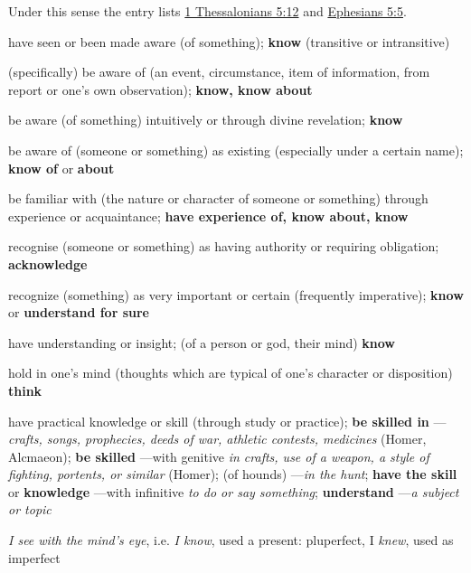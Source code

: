 \begin{compactdesc}
\begin{compactitem}
\begin{compactitem}
									\item Under this sense the entry lists \hyperref[1THESSALONIANS-5-12]{1 Thessalonians 5:12} and \hyperref[EPHESIANS-5-5]{Ephesians 5:5}.
								\end{compactitem}
						\end{compactitem}
					\item[CGL 988b, PDF 1028] \textbf{}
						\begin{compactitem}
							\item[1] have seen or been made aware (of something); \textbf{know} (transitive or intransitive)
							\item[2] (specifically) be aware of (an event, circumstance, item of information, from report or one's own observation); \textbf{know, know about}
							\item[3] be aware (of something) intuitively or through divine revelation; \textbf{know}
							\item[4] be aware of (someone or something) as existing (especially under a certain name); \textbf{know of} or \textbf{about}
							\item[5] be familiar with (the nature or character of someone or something) through experience or acquaintance; \textbf{have experience of, know about, know}
							\item[6] recognise (someone or something) as having authority or requiring obligation; \textbf{acknowledge}
							\item[7] recognize (something) as very important or certain (frequently imperative); \textbf{know} or \textbf{understand for sure}
							\item[8] have understanding or insight; (of a person or god, their mind) \textbf{know}
							\item[9] hold in one's mind (thoughts which are typical of one's character or disposition) \textbf{think}
							\item[10] have practical knowledge or skill (through study or practice); \textbf{be skilled in} ---\textit{crafts, songs, prophecies, deeds of war, athletic contests, medicines} (Homer, Alcmaeon); \textbf{be skilled} ---with genitive \textit{in crafts, use of a weapon, a style of fighting, portents, or similar} (Homer); (of hounds) ---\textit{in the hunt}; \textbf{have the skill} or \textbf{knowledge} ---with infinitive \textit{to do or say something}; \textbf{understand} ---\textit{a subject or topic}
						\end{compactitem}
					\item[LSJ 483a, PDF 554] \textit{I see with the mind's eye}, i.e. \textit{I know}, used a present: pluperfect, I \textit{knew}, used as imperfect

\end{compactdesc}
